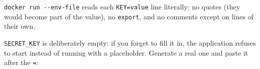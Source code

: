\begin{codebox}[short]

\begin{Shaded}
\begin{Highlighting}[]
\end{Highlighting}
\end{Shaded}

\end{codebox}

\begin{codebox}[short]

\begin{Shaded}
\begin{Highlighting}[]

\OperatorTok{=}
\OperatorTok{=}
\OperatorTok{=}
\OperatorTok{=}
\OperatorTok{=}
\end{Highlighting}
\end{Shaded}

\end{codebox}

\noindent{}\texttt{docker\ run\ -\/-env-file} reads each \texttt{KEY=value} line literally: no quotes (they would become part of the value), no \texttt{export}, and no comments except on lines of their own.

\texttt{SECRET\_KEY} is deliberately empty: if you forget to fill it in, the application refuses to start instead of running with a placeholder. Generate a real one and paste it after the \texttt{=}:

\begin{codebox}[short]

\begin{Shaded}
\begin{Highlighting}[]
  
\end{Highlighting}
\end{Shaded}

\end{codebox}


